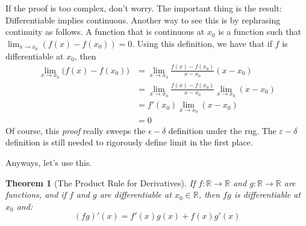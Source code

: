 \documentclass{article}
\theoremstyle{normal}
\theoremstyle{plain}
\newtheorem{theorem}{Theorem}
\begin{document}
    If the proof is too complex, don't worry. The important thing is the
    result: Differentiable implies continuous. Another way to see this is by
    rephrasing continuity as follows. A function that is continuous at $x_{0}$
    is a function such that $\lim_{x\rightarrow{x_{0}}}(f(x)-f(x_{0}))=0$. Using
    this definition, we have that if $f$ is differentiable at $x_{0}$, then
    \begin{align}
        \lim_{x\rightarrow{x}_{0}}\big(f(x)-f(x_{0})\big)
        &=\lim_{x\rightarrow{x}_{0}}\frac{f(x)-f(x_{0})}{x-x_{0}}(x-x_{0})\\
        &=\lim_{x\rightarrow{x}_{0}}\frac{f(x)-f(x_{0})}{x-x_{0}}
            \lim_{x\rightarrow{x_{0}}}(x-x_{0})\\
        &=f'(x_{0})\lim_{x\rightarrow{x}_{0}}(x-x_{0})\\
        &=0
    \end{align}
    Of course, this \textit{proof} really sweeps the $\epsilon-\delta$
    definition under the rug. The $\varepsilon-\delta$ definition is still
    needed to rigorously define limit in the first place.
    \par\hfill\par
    Anyways, let's use this.
    \begin{theorem}[The Product Rule for Derivatives]
        If $f:\mathbb{R}\rightarrow\mathbb{R}$ and
        $g:\mathbb{R}\rightarrow\mathbb{R}$ are functions, and if $f$ and $g$
        are differentiable at $x_{0}\in\mathbb{R}$, then $fg$ is differentiable
        at $x_{0}$ and:
        \begin{equation}
            (fg)'(x)=f'(x)g(x)+f(x)g'(x)
        \end{equation}
    \end{theorem}
\end{document}
